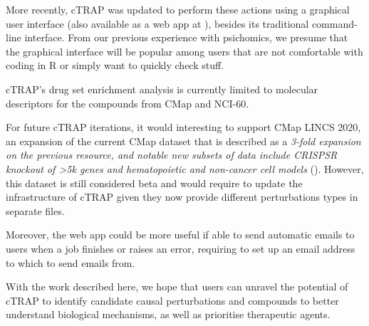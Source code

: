 More recently, cTRAP was updated to perform these actions using a graphical user interface (also available as a web app at ), besides its traditional command-line interface. From our previous experience with psichomics, we presume that the graphical interface will be popular among users that are not comfortable with coding in R or simply want to quickly check stuff.

cTRAP's drug set enrichment analysis is currently limited to molecular descriptors for the compounds from CMap and NCI-60.

For future cTRAP iterations, it would interesting to support CMap LINCS 2020, an expansion of the current CMap dataset that is described as a \emph{3-fold expansion on the previous resource, and notable new subsets of data include CRISPSR knockout of \textgreater 5k genes and hematopoietic and non-cancer cell models} (). However, this dataset is still considered beta and would require to update the infrastructure of cTRAP given they now provide different perturbations types in separate files.

Moreover, the web app could be more useful if able to send automatic emails to users when a job finishes or raises an error, requiring to set up an email address to which to send emails from.

With the work described here, we hope that users can unravel the potential of cTRAP to identify candidate causal perturbations and compounds to better understand biological mechanisms, as well as prioritise therapeutic agents.
